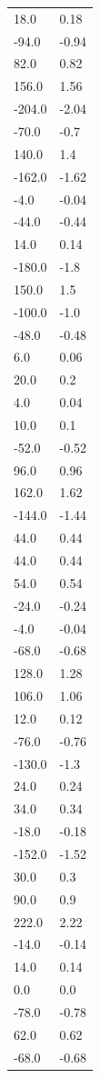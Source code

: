 \begin{longtable}{ll}
18.0 & 0.18 \\
-94.0 & -0.94 \\
82.0 & 0.82 \\
156.0 & 1.56 \\
-204.0 & -2.04 \\
-70.0 & -0.7 \\
140.0 & 1.4 \\
-162.0 & -1.62 \\
-4.0 & -0.04 \\
-44.0 & -0.44 \\
14.0 & 0.14 \\
-180.0 & -1.8 \\
150.0 & 1.5 \\
-100.0 & -1.0 \\
-48.0 & -0.48 \\
6.0 & 0.06 \\
20.0 & 0.2 \\
4.0 & 0.04 \\
10.0 & 0.1 \\
-52.0 & -0.52 \\
96.0 & 0.96 \\
162.0 & 1.62 \\
-144.0 & -1.44 \\
44.0 & 0.44 \\
44.0 & 0.44 \\
54.0 & 0.54 \\
-24.0 & -0.24 \\
-4.0 & -0.04 \\
-68.0 & -0.68 \\
128.0 & 1.28 \\
106.0 & 1.06 \\
12.0 & 0.12 \\
-76.0 & -0.76 \\
-130.0 & -1.3 \\
24.0 & 0.24 \\
34.0 & 0.34 \\
-18.0 & -0.18 \\
-152.0 & -1.52 \\
30.0 & 0.3 \\
90.0 & 0.9 \\
222.0 & 2.22 \\
-14.0 & -0.14 \\
14.0 & 0.14 \\
0.0 & 0.0 \\
-78.0 & -0.78 \\
62.0 & 0.62 \\
-68.0 & -0.68 \\

\end{longtable}
